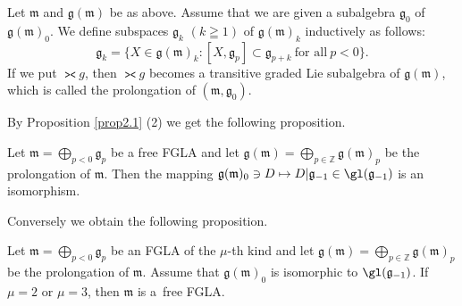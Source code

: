 Let $\mathfrak m$ and $\mathfrak g(\mathfrak m)$ be as above.
Assume that we are given a subalgebra $\mathfrak g_0$ of
$\mathfrak g(\mathfrak m)_0$.
We def\/ine subspaces $\mathfrak g_k$ $(k\geqq 1)$ of
$\mathfrak g(\mathfrak m)_k$ inductively as follows:
\[
\mathfrak g_k=\{ X\in\mathfrak g(\mathfrak m)_k:
[X,\mathfrak g_p]\subset \mathfrak g_{p+k}\
\text{for all}\ p<0 \}.
\]
If we put $\gla g$, then
$\gla g$ becomes a transitive graded Lie subalgebra of $\mathfrak g(\mathfrak m)$,
which is called the prolongation of
$(\mathfrak m,\mathfrak g_0)$.

By Proposition \ref{prop2.1} (2) we get the following proposition.
\begin{proposition}\label{prop4.1} Let $\mathfrak m=\bigoplus\limits_{p<0}\mathfrak g_p$ be a
free FGLA and let $\mathfrak g(\mathfrak m)
=\bigoplus\limits_{p\in\mathbb Z}\mathfrak g(\mathfrak m)_p$
be the prolongation of $\mathfrak m$.
Then the mapping $\mathfrak g(\mathfrak m)_0\ni D\mapsto D|\mathfrak g_{-1}
\in\gl(\mathfrak g_{-1})$ is an isomorphism.
\end{proposition}
Conversely we obtain the following proposition.

\begin{proposition}\label{prop4.2}
Let $\mathfrak m=\bigoplus\limits_{p<0}\mathfrak g_p$ be an
FGLA of the $\mu$-th kind and let
$\mathfrak g(\mathfrak m)
=\bigoplus\limits_{p\in\mathbb Z}\mathfrak g(\mathfrak m)_p$
be the prolongation of $\mathfrak m$.
Assume that $\mathfrak g(\mathfrak m)_0$ is isomorphic to
$\gl(\mathfrak g_{-1})$.
If $\mu=2$ or $\mu=3$,
then $\mathfrak m$ is a~free FGLA.
\end{proposition}

